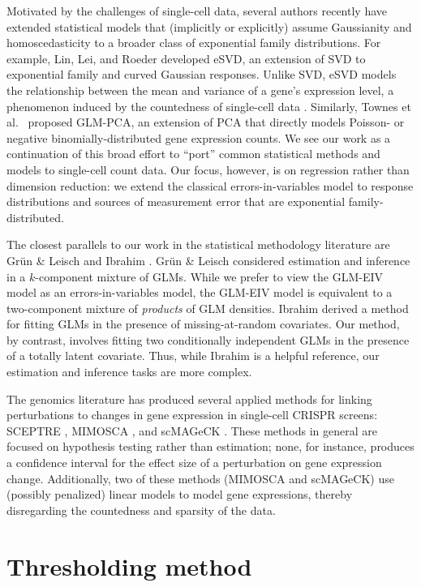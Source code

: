 \documentclass[12pt]{article}
\begin{document}
Motivated by the challenges of single-cell data, several authors recently have extended statistical models that (implicitly or explicitly) assume Gaussianity and homoscedasticity to a broader class of exponential family distributions. For example, Lin, Lei, and Roeder \cite{Lin2021} developed eSVD, an extension of SVD to exponential family and curved Gaussian responses. Unlike SVD, eSVD models the relationship between the mean and variance of a gene's expression level, a phenomenon induced by the countedness of single-cell data \cite{Lause2021}.
Similarly, Townes et al.\ \cite{Townes2019} proposed GLM-PCA, an extension of PCA that directly models Poisson- or negative binomially-distributed gene expression counts. We see our work as a continuation of this broad effort to ``port'' common statistical methods and models to single-cell count data. Our focus, however, is on regression rather than dimension reduction: we extend the classical errors-in-variables model to response distributions and sources of measurement error that are exponential family-distributed.

The closest parallels to our work in the statistical methodology literature are Gr\"{u}n \& Leisch \cite{Grun2008} and Ibrahim \cite{Ibrahim1990}. Gr\"{u}n \& Leisch considered estimation and inference in a $k$-component mixture of GLMs. While we prefer to view the GLM-EIV model as an errors-in-variables model,  the GLM-EIV model is equivalent to a two-component mixture of \textit{products} of GLM densities. Ibrahim derived a method for fitting GLMs in the presence of missing-at-random covariates. Our method, by contrast, involves fitting two conditionally independent GLMs in the presence of a totally latent covariate. Thus, while Ibrahim is a helpful reference, our estimation and inference tasks are more complex.

The genomics literature has produced several applied methods for linking perturbations to changes in gene expression in single-cell CRISPR screens: SCEPTRE \cite{Barry2020}, MIMOSCA \cite{Dixit2016}, and scMAGeCK \cite{Yang2019}. These methods in general are focused on hypothesis testing rather than estimation; none, for instance, produces a confidence interval for the effect size of a perturbation on gene expression change. Additionally, two of these methods (MIMOSCA and scMAGeCK) use (possibly penalized) linear models to model gene expressions, thereby disregarding the countedness and sparsity of the data. 

\section{Thresholding method}
\end{document}
